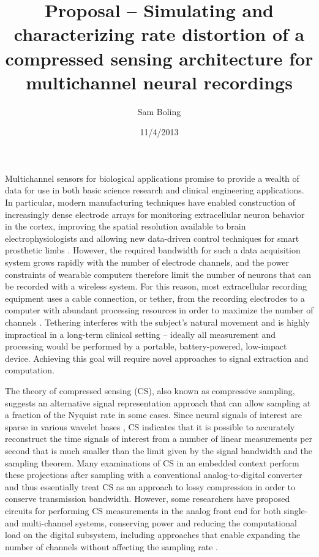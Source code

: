 \documentclass{paper}
\title{Proposal -- Simulating and characterizing rate distortion of a compressed sensing architecture for multichannel neural recordings}
\author{Sam Boling}
\date{11/4/2013}
\begin{document}
\maketitle

Multichannel sensors for biological applications promise to provide a wealth of data for use in both basic science research and clinical engineering applications. In particular, modern manufacturing techniques have enabled construction of increasingly dense electrode arrays for monitoring extracellular neuron behavior in the cortex, improving the spatial resolution available to brain electrophysiologists and allowing new data-driven control techniques for smart prosthetic limbs \cite{hochberg2012}. However, the required bandwidth for such a data acquisition system grows rapidly with the number of electrode channels, and the power constraints of wearable computers therefore limit the number of neurons that can be recorded with a wireless system. For this reason, most extracellular recording equipment uses a cable connection, or tether, from the recording electrodes to a computer with abundant processing resources in order to maximize the number of channels \cite{nicolelis2001}. Tethering interferes with the subject's natural movement and is highly impractical in a long-term clinical setting -- ideally all measurement and processing would be performed by a portable, battery-powered, low-impact device. Achieving this goal will require novel approaches to signal extraction and computation.

The theory of compressed sensing (CS), also known as compressive sampling, suggests an alternative signal representation approach that can allow sampling at a fraction of the Nyquist rate in some cases. Since neural signals of interest are sparse in various wavelet bases \cite{charbiwala2011}, CS indicates that it is possible to accurately reconstruct the time signals of interest from a number of linear measurements per second that is much smaller than the limit given by the signal bandwidth and the sampling theorem. Many examinations of CS in an embedded context perform these projections after sampling with a conventional analog-to-digital converter and thus essentially treat CS as an approach to lossy compression in order to conserve transmission bandwidth. However, some researchers have proposed circuits for performing CS measurements in the analog front end for both single- and multi-channel systems, conserving power and reducing the computational load on the digital subsystem, including approaches that enable expanding the number of channels without affecting the sampling rate \cite{kirolos2006, slavinsky2011}.
\end{document}
